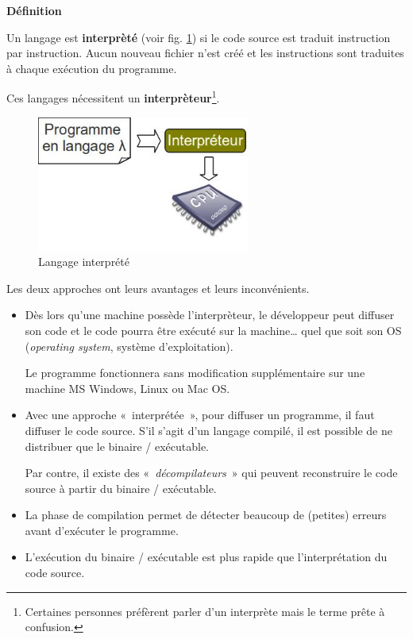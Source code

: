 \textbf{Définition}

Un langage est \textbf{interprèté} (voir fig. \ref{interprété}) si le code
source est traduit instruction par instruction. Aucun nouveau fichier n'est créé
et les instructions sont traduites à chaque exécution du programme. 

Ces langages nécessitent un \textbf{interprèteur}\footnote{Certaines personnes 
préfèrent parler d'un interprète mais le terme prête à confusion.}.

\begin{figure}[h]
\begin{center}
\includegraphics[width=7cm]{images/java-jvm-interp}
\caption{Langage interprété}
\label{interprété}
\end{center}
\end{figure}

Les deux approches ont leurs avantages et leurs inconvénients. 

\begin{itemize}
	
	\item Dès lors qu'une machine possède l'interprèteur, le développeur peut
		diffuser son code et le code pourra être exécuté sur la machine\ldots
		quel que soit son OS (\textit{operating system}, système d'exploitation). 

		Le programme fonctionnera sans modification supplémentaire sur une 
		machine MS Windows, Linux ou Mac OS. 

	\item Avec une approche «~interprétée~», pour diffuser un programme, il faut 
		diffuser le code source. S'il s'agit d'un langage compilé, il est possible
		de ne distribuer que le binaire / exécutable.

		Par contre, il existe des «~\textit{décompilateurs}~» qui peuvent
		reconstruire le code source à partir du binaire / exécutable.

	\item La phase de compilation permet de détecter beaucoup de (petites)
		erreurs avant d'exécuter le programme.

	\item L'exécution du binaire / exécutable est plus rapide que
		l'interprétation du code source. 

\end{itemize}

